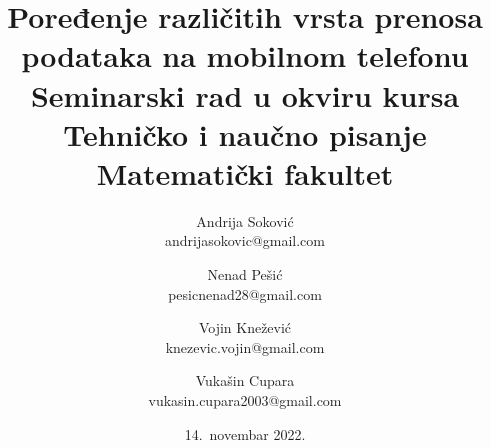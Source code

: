 \documentclass[a4paper]{article}
\begin{document}
\title{Poređenje različitih vrsta prenosa podataka na mobilnom telefonu\\ \small{Seminarski rad u okviru kursa\\Tehničko i naučno pisanje\\ Matematički fakultet}}

\author{Andrija Soković\\ 
\small{andrijasokovic@gmail.com}
\and
Nenad Pešić\\
\small{pesicnenad28@gmail.com}
\and
Vojin Knežević\\
\small{knezevic.vojin@gmail.com}
\and 
Vukašin Cupara\\
\small{vukasin.cupara2003@gmail.com} 
}
\date{14.~novembar 2022.}
\maketitle
\end{document}
